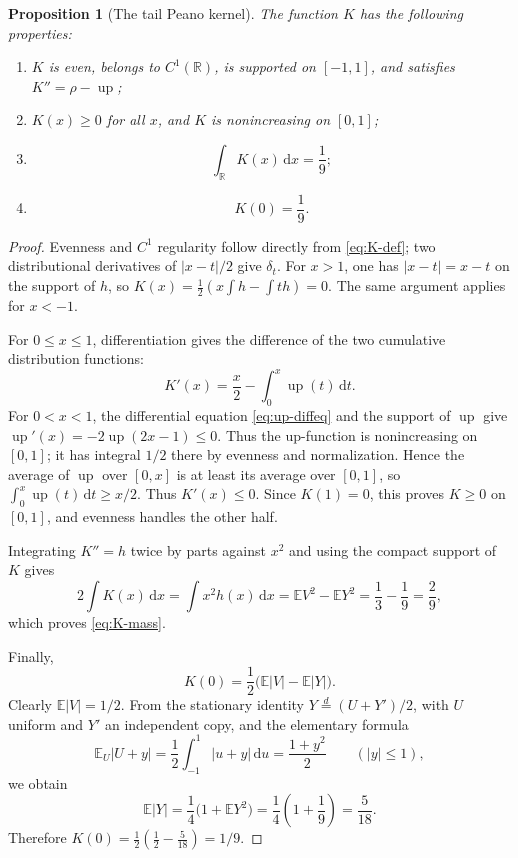 \documentclass[11pt,oneside]{article}
\newtheorem{proposition}[theorem]{Proposition}
\theoremstyle{definition}
\theoremstyle{remark}
\newcommand{\R}{\mathbb R}
\newcommand{\Up}{\operatorname{up}}
\newcommand{\E}{\mathbb E}
\newcommand{\dd}{\,\mathrm d}
\begin{document}
\begin{proposition}[The tail Peano kernel]
\label{prop:K-properties}
The function $K$ has the following properties:
\begin{enumerate}
\item $K$ is even, belongs to $C^1(\R)$, is supported on $[-1,1]$, and satisfies $K''=\rho-\Up$;
\item $K(x)\ge0$ for all $x$, and $K$ is nonincreasing on $[0,1]$;
\item
\begin{equation}
 \int_{\R}K(x)\dd x=\frac19;                              \label{eq:K-mass}
\end{equation}
\item
\begin{equation}
 K(0)=\frac19.                                             \label{eq:K-zero}
\end{equation}
\end{enumerate}
\end{proposition}

\begin{proof}
Evenness and $C^1$ regularity follow directly from \eqref{eq:K-def}; two distributional
derivatives of $|x-t|/2$ give $\delta_t$.  For $x>1$, one has $|x-t|=x-t$ on the support of
$h$, so $K(x)=\tfrac12(x\int h-\int th)=0$.  The same argument applies for $x<-1$.

For $0\le x\le1$, differentiation gives the difference of the two cumulative distribution
functions:
\begin{equation}
 K'(x)=\frac{x}{2}-\int_0^x\Up(t)\dd t.                    \label{eq:K-prime}
\end{equation}
For $0<x<1$, the differential equation \eqref{eq:up-diffeq} and the support of $\Up$ give
$\Up'(x)=-2\Up(2x-1)\le0$.  Thus the up-function is nonincreasing on $[0,1]$; it
has integral $1/2$ there by evenness and normalization.  Hence the average of $\Up$ over
$[0,x]$ is at least its average over $[0,1]$, so
$\int_0^x\Up(t)\dd t\ge x/2$.  Thus $K'(x)\le0$.  Since $K(1)=0$, this proves $K\ge0$ on
$[0,1]$, and evenness handles the other half.

Integrating $K''=h$ twice by parts against $x^2$ and using the compact support of $K$ gives
\[
 2\int K(x)\dd x=\int x^2h(x)\dd x
 =\E V^2-\E Y^2=\frac13-\frac19=\frac29,
\]
which proves \eqref{eq:K-mass}.

Finally,
\[
 K(0)=\frac12\bigl(\E|V|-\E|Y|\bigr).
\]
Clearly $\E|V|=1/2$.  From the stationary identity
$Y\overset d=(U+Y')/2$, with $U$ uniform and $Y'$ an independent copy, and the elementary
formula
\[
 \E_U|U+y|=\frac12\int_{-1}^{1}|u+y|\dd u=\frac{1+y^2}{2}
 \qquad(|y|\le1),
\]
we obtain
\[
 \E|Y|=\frac14\bigl(1+\E Y^2\bigr)=\frac14\left(1+\frac19\right)=\frac5{18}.
\]
Therefore $K(0)=\tfrac12(\tfrac12-\tfrac5{18})=1/9$.
\end{proof}
\end{document}

